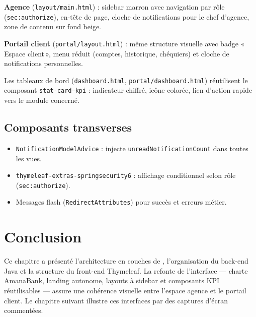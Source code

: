 \textbf{Agence} (\texttt{layout/main.html}) : sidebar marron avec navigation par rôle (\texttt{sec:authorize}), en-tête de page, cloche de notifications pour le chef d'agence, zone de contenu sur fond beige.

\textbf{Portail client} (\texttt{portal/layout.html}) : même structure visuelle avec badge «\,Espace client\,», menu réduit (comptes, historique, chéquiers) et cloche de notifications personnelles.

Les tableaux de bord (\texttt{dashboard.html}, \texttt{portal/dashboard.html}) réutilisent le composant \texttt{stat-card--kpi} : indicateur chiffré, icône colorée, lien d'action rapide vers le module concerné.

\subsection{Composants transverses}

\begin{itemize}[leftmargin=*]
    \item \texttt{NotificationModelAdvice} : injecte \texttt{unreadNotificationCount} dans toutes les vues.
    \item \texttt{thymeleaf-extras-springsecurity6} : affichage conditionnel selon rôle (\texttt{sec:authorize}).
    \item Messages flash (\texttt{RedirectAttributes}) pour succès et erreurs métier.
\end{itemize}

\section{Conclusion}

Ce chapitre a présenté l'architecture en couches de \nomapplication, l'organisation du back-end Java et la structure du front-end Thymeleaf. La refonte de l'interface — charte AmanaBank, landing autonome, layouts à sidebar et composants KPI réutilisables — assure une cohérence visuelle entre l'espace agence et le portail client. Le chapitre suivant illustre ces interfaces par des captures d'écran commentées.
